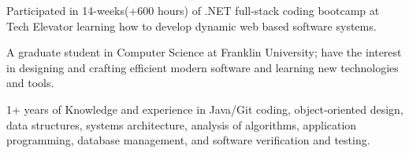 \begin{cventries}
  \cventry
    {}
    {}
    {}
    {}
    {
      \vspace{-7mm}\begin{cvitems}
 \item {Participated in 14-weeks(+600 hours) of .NET full-stack coding bootcamp at Tech Elevator learning how to develop dynamic web based software systems.}
 \item {A graduate student in Computer Science at Franklin University; have the interest in designing and crafting efficient modern software
and learning new technologies and tools.}
        \item {1+ years of Knowledge and experience in Java/Git coding, object-oriented design, data structures, systems architecture, analysis of algorithms, application programming, database management, and software verification and testing.}     
      \end{cvitems}
    }
\end{cventries}
